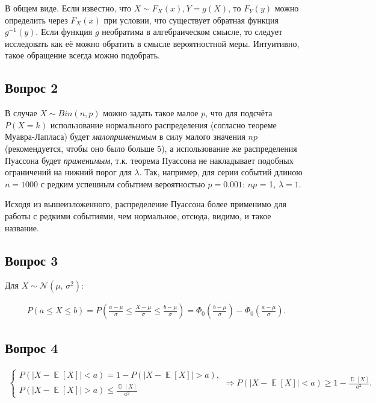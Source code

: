 \documentclass[a4paper,11pt]{article}
\DeclareMathOperator*{\D}{\mathbb{D}}   %
\DeclareMathOperator*{\E}{\mathbb{E}}   %
\begin{document}
В общем виде. Если известно, что $X \sim F_X(x), Y = g(X)$, то $F_Y(y)$ можно определить через $F_X(x)$ при условии, что существует обратная функция $g^{-1}(y)$. Если функция $g$ необратима в алгебраическом смысле, то следует исследовать как её можно обратить в смысле вероятностной меры. Интуитивно, такое обращение всегда можно подобрать.

\subsection{Вопрос 2}

В случае $X \sim Bin(n, p)$ можно задать такое малое $p$, что для подсчёта $P(X=k)$ использование нормального распределения (согласно теореме Муавра-Лапласа) будет \textit{малоприменимым} в силу малого значения $np$ (рекомендуется, чтобы оно было больше 5), а использование же распределения Пуассона будет \textit{применимым}, т.к. теорема Пуассона не накладывает подобных ограничений на нижний порог для $\lambda$. Так, например, для серии событий длиною $n = 1000$ с редким успешным событием вероятностью $p=0.001$: $np$ = 1, $\lambda = 1$.

Исходя из вышеизложенного, распределение Пуассона более применимо для работы с редкими событиями, чем нормальное, отсюда, видимо, и такое название.

\subsection{Вопрос 3}

Для $X \sim \mathcal{N}(\mu,\,\sigma^{2})$:

\begin{align*}
P(a \leq X \leq b) = P(\frac{a-\mu}{\sigma} \leq \frac{X - \mu}{\sigma} \leq \frac{b-\mu}{\sigma})
= \Phi_0(\frac{b-\mu}{\sigma}) - \Phi_0(\frac{a-\mu}{\sigma}).
\end{align*}

\subsection{Вопрос 4}

\begin{align*}
\begin{cases}
  P(|X-\E[X]| < a) = 1 - P(|X-\E[X]| > a), \\
  P(|X-\E[X]| > a) \leq \frac{\D[X]}{a^2}
\end{cases}
\Rightarrow
P(|X-\E[X]| < a) \geq 1 - \frac{\D[X]}{a^2}.
\end{align*}
\end{document}
